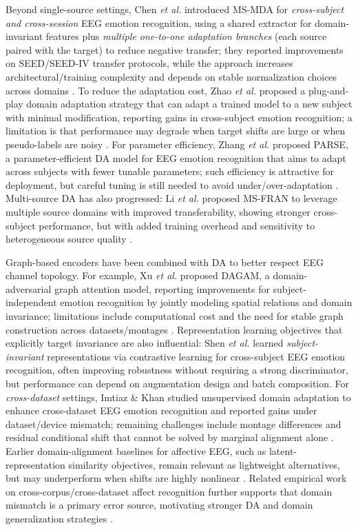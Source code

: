 \documentclass{WileyMSP-template}
\begin{document}
Beyond single-source settings, Chen \textit{et al.} introduced MS-MDA for \emph{cross-subject and cross-session} EEG emotion recognition, using a shared extractor for domain-invariant features plus \emph{multiple one-to-one adaptation branches} (each source paired with the target) to reduce negative transfer; they reported improvements on SEED/SEED-IV transfer protocols, while the approach increases architectural/training complexity and depends on stable normalization choices across domains \cite{chen2021msmda}. To reduce the adaptation cost, Zhao \textit{et al.} proposed a plug-and-play domain adaptation strategy that can adapt a trained model to a new subject with minimal modification, reporting gains in cross-subject emotion recognition; a limitation is that performance may degrade when target shifts are large or when pseudo-labels are noisy \cite{zhao2021ppda}. For parameter efficiency, Zhang \textit{et al.} proposed PARSE, a parameter-efficient DA model for EEG emotion recognition that aims to adapt across subjects with fewer tunable parameters; such efficiency is attractive for deployment, but careful tuning is still needed to avoid under/over-adaptation \cite{zhang2022_parse}. Multi-source DA has also progressed: Li \textit{et al.} proposed MS-FRAN to leverage multiple source domains with improved transferability, showing stronger cross-subject performance, but with added training overhead and sensitivity to heterogeneous source quality \cite{li2023msfran}.

Graph-based encoders have been combined with DA to better respect EEG channel topology. For example, Xu \textit{et al.} proposed DAGAM, a domain-adversarial graph attention model, reporting improvements for subject-independent emotion recognition by jointly modeling spatial relations and domain invariance; limitations include computational cost and the need for stable graph construction across datasets/montages \cite{xu2023dagam}. Representation learning objectives that explicitly target invariance are also influential: Shen \textit{et al.} \cite{shen2022contrastive} learned \emph{subject-invariant} representations via contrastive learning for cross-subject EEG emotion recognition, often improving robustness without requiring a strong discriminator, but performance can depend on augmentation design and batch composition. For \emph{cross-dataset} settings, Imtiaz \& Khan studied unsupervised domain adaptation to enhance cross-dataset EEG emotion recognition and reported gains under dataset/device mismatch; remaining challenges include montage differences and residual conditional shift that cannot be solved by marginal alignment alone \cite{Imtiaz2025}. Earlier domain-alignment baselines for affective EEG, such as latent-representation similarity objectives, remain relevant as lightweight alternatives, but may underperform when shifts are highly nonlinear \cite{li2019lrs}. Related empirical work on cross-corpus/cross-dataset affect recognition further supports that domain mismatch is a primary error source, motivating stronger DA and domain generalization strategies \cite{rayatdoost2018crosscorpus,zhou2022dgsurvey,cimtay2020pretrainedcnn}.
\end{document}
